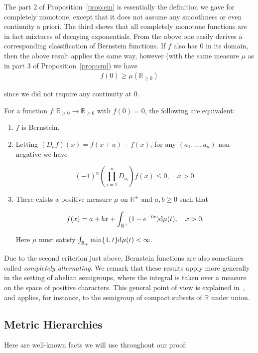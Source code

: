 The part 2 of Proposition~\ref{prop:cm} is essentially the definition we gave for completely monotone, except that it does not assume any smoothness or even continuity a priori. The third shows that all completely monotone functions are in fact mixtures of decaying exponentials. From the above one easily derives a corresponding classification of Bernstein functions. If $f$ also has $0$ in its domain, then the above result applies the same way, however (with the same measure $\mu$ as in part $3$ of Proposition~\ref{prop:cm}) we have 
\begin{align*}
f(0)\geq \mu(\mathbb R_{\geq 0})
\end{align*}

since we did not require any continuity at $0$. 

\begin{prop}
\label{prop:bern}
For a function $f:\mathbb R_{\geq 0}\to\mathbb R_{\geq 0}$ with $f(0)=0$, the following are equivalent:

\begin{enumerate}
  \item $f$ is Bernstein.
  \item Letting $(D_af)(x)=f(x+a)-f(x)$, for any $(a_1,\dots,a_n)$ non-negative we have 

  \[(-1)^n \left(\prod_{i=1}^n D_{a_i}\right)f(x)\leq 0,\quad x>0.\]

  \item There exists a positive measure $\mu$ on $\mathbb R^+$ and $a,b\geq 0$ such that 

  \[f(x)=a+bx+\int_{\mathbb R^+} (1-e^{-tx}) \mathrm{d} \mu(t),\quad x>0.\]

  Here $\mu$ must satisfy $\int_{\mathbb{R}_+} \min\{1,t\} \mathrm{d} \mu(t)<\infty.$
\end{enumerate}


\end{prop}

Due to the second criterion just above, Bernstein functions are also sometimes called \emph{completely alternating}. We remark that these results apply more generally in the setting of abelian semigroups, where the integral is taken over a measure on the space of positive characters. This general point of view is explained in~\cite[Chapter 6]{harmonic}, and applies, for instance, to the semigroup of compact subsets of $\mathbb R$ under union.




\subsection{Metric Hierarchies}\label{sec:preli:metric}
Here are well-known facts we will use throughout our proof:

